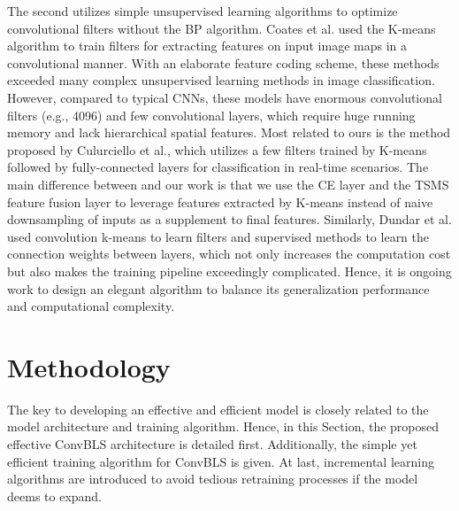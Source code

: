 \documentclass[lettersize,journal]{IEEEtran}
\begin{document}
The second utilizes simple unsupervised learning algorithms to optimize convolutional filters without the BP algorithm. Coates et al.\cite{coates2011analysis, coates2012learning, coates2011selecting} used the K-means algorithm to train filters for extracting features on input image maps in a convolutional manner. With an elaborate feature coding scheme, these methods exceeded many complex unsupervised learning methods in image classification. However, compared to typical CNNs\cite{krizhevsky2012imagenet, szegedy2015going, he2016deep, huang2017densely}, these models have enormous convolutional filters (e.g., 4096) and few convolutional layers, which require huge running memory and lack hierarchical spatial features. Most related to ours is the method proposed by Culurciello et al.\cite{culurciello2013analysis}, which utilizes a few filters trained by K-means followed by fully-connected layers for classification in real-time scenarios. The main difference between \cite{culurciello2013analysis} and our work is that we use the CE layer and the TSMS feature fusion layer to leverage features extracted by K-means instead of naive downsampling of inputs as a supplement to final features. Similarly, Dundar et al.\cite{dundar2015convolutional} used convolution k-means to learn filters and supervised methods to learn the connection weights between layers, which not only increases the computation cost but also makes the training pipeline exceedingly complicated. Hence, it is ongoing work to design an elegant algorithm to balance its generalization performance and computational complexity.

\section{Methodology}
The key to developing an effective and efficient model is closely related to the model architecture and training algorithm. Hence, in this Section, the proposed effective ConvBLS architecture is detailed first. Additionally, the simple yet efficient training algorithm for ConvBLS is given. At last, incremental learning algorithms are introduced to avoid tedious retraining processes if the model deems to expand.
\end{document}
